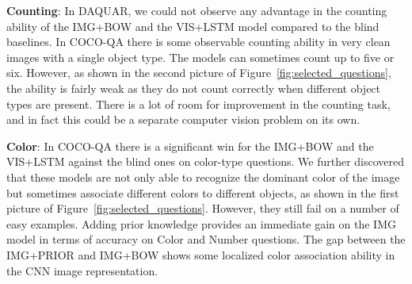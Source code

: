 \textbf{Counting}: In DAQUAR, we could not observe any advantage in the
counting ability of the IMG+BOW and the VIS+LSTM model compared to the blind
baselines. In COCO-QA there is some observable counting ability in very clean
images with a single object type. The models can sometimes count up to five or
six. However, as shown in the second picture of
Figure~\ref{fig:selected_questions}, the ability is fairly weak as they do not
count correctly when different object types are present. There is a lot of room
for improvement in the counting task, and in fact this could be a separate
computer vision problem on its own.

\textbf{Color}: In COCO-QA there is a significant win for the IMG+BOW and the
VIS+LSTM against the blind ones on color-type questions. We further discovered
that these models are not only able to recognize the dominant color of the image
but sometimes associate different colors to different objects, as shown in the
first picture of Figure~\ref{fig:selected_questions}. However, they still
fail on a number of easy examples. Adding prior knowledge provides an
immediate gain on the IMG model in terms of accuracy on Color and Number
questions. The gap between the IMG+PRIOR and IMG+BOW shows some localized color
association ability in the CNN image representation.

